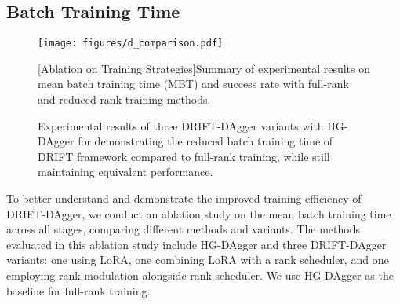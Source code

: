 \subsection{Batch Training Time}
\label{sec:abl_rm}
\begin{figure}[htbp]
\centering
\begin{minipage}{\columnwidth}
\centering
\texttt{[image: figures/d\_comparison.pdf]}
\caption{Experimental results of three DRIFT-DAgger variants with HG-DAgger for demonstrating the reduced batch training time of DRIFT framework compared to full-rank training, while still maintaining equivalent performance.}
\label{fig:batch_training_time}
\end{minipage}

\vspace{1em} 

\begin{minipage}{\columnwidth}
\centering
\renewcommand\arraystretch{1.2}
[Ablation on Training Strategies]{Summary of experimental results on mean batch training time (MBT) and success rate with full-rank and reduced-rank training methods.}
\label{tab:training_strategies}
\end{minipage}
\end{figure}
To better understand and demonstrate the improved training efficiency of DRIFT-DAgger, we conduct an ablation study on the mean batch training time across all stages, comparing different methods and variants. The methods evaluated in this ablation study include HG-DAgger and three DRIFT-DAgger variants: one using LoRA, one combining LoRA with a rank scheduler, and one employing rank modulation alongside rank scheduler. We use HG-DAgger as the baseline for full-rank training.

